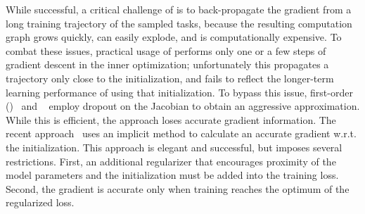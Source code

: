 While successful, a critical challenge of \maml is to back-propagate the gradient from a long training trajectory of the sampled tasks, because the resulting computation graph grows quickly, can easily explode, and is computationally expensive. To combat these issues, practical usage of \maml performs only one or a few steps of gradient descent in the inner optimization; unfortunately this propagates a trajectory only close to the initialization, and fails to reflect the longer-term learning performance of using that initialization. To bypass this issue, first-order \maml (\fomaml)~\citep{finn2017model} and \rap ~\citep{nichol2018first} employ dropout on the Jacobian to obtain an aggressive approximation. While this is efficient, the approach loses accurate gradient information. The recent \imaml approach~\citep{rajeswaran2019meta} uses an implicit method to calculate an accurate gradient w.r.t. the initialization. This approach is elegant and successful, but imposes several restrictions. First, an additional regularizer that encourages proximity of the model parameters and the initialization must be added into the training loss. Second, the gradient is accurate only when training reaches the optimum of the regularized loss. 
